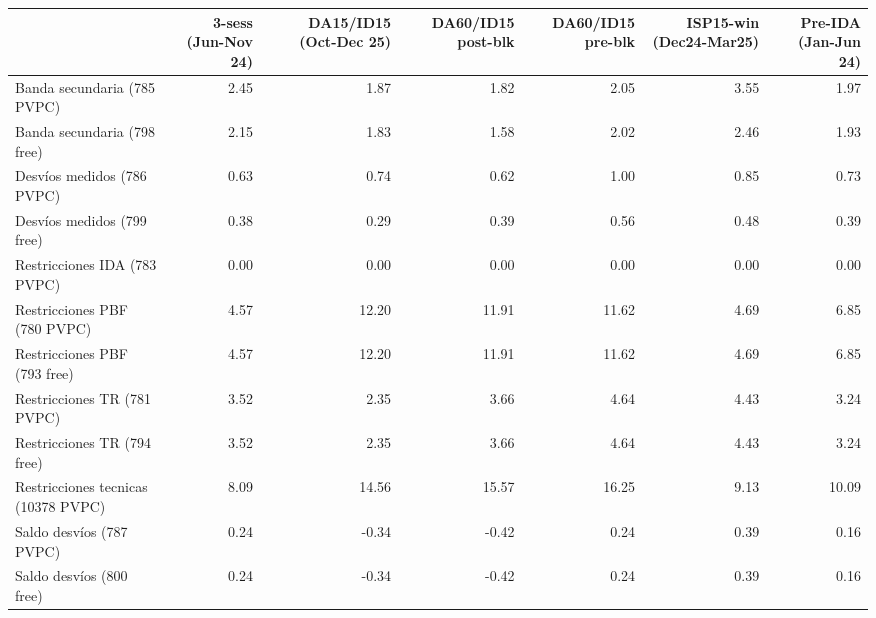 \begin{tabular}{lrrrrrr}
\toprule
 & 3-sess (Jun-Nov 24) & DA15/ID15 (Oct-Dec 25) & DA60/ID15 post-blk & DA60/ID15 pre-blk & ISP15-win (Dec24-Mar25) & Pre-IDA (Jan-Jun 24) \\
\midrule
Banda secundaria (785 PVPC) & 2.45 & 1.87 & 1.82 & 2.05 & 3.55 & 1.97 \\
Banda secundaria (798 free) & 2.15 & 1.83 & 1.58 & 2.02 & 2.46 & 1.93 \\
Desvíos medidos (786 PVPC) & 0.63 & 0.74 & 0.62 & 1.00 & 0.85 & 0.73 \\
Desvíos medidos (799 free) & 0.38 & 0.29 & 0.39 & 0.56 & 0.48 & 0.39 \\
Restricciones IDA (783 PVPC) & 0.00 & 0.00 & 0.00 & 0.00 & 0.00 & 0.00 \\
Restricciones PBF (780 PVPC) & 4.57 & 12.20 & 11.91 & 11.62 & 4.69 & 6.85 \\
Restricciones PBF (793 free) & 4.57 & 12.20 & 11.91 & 11.62 & 4.69 & 6.85 \\
Restricciones TR (781 PVPC) & 3.52 & 2.35 & 3.66 & 4.64 & 4.43 & 3.24 \\
Restricciones TR (794 free) & 3.52 & 2.35 & 3.66 & 4.64 & 4.43 & 3.24 \\
Restricciones tecnicas (10378 PVPC) & 8.09 & 14.56 & 15.57 & 16.25 & 9.13 & 10.09 \\
Saldo desvíos (787 PVPC) & 0.24 & -0.34 & -0.42 & 0.24 & 0.39 & 0.16 \\
Saldo desvíos (800 free) & 0.24 & -0.34 & -0.42 & 0.24 & 0.39 & 0.16 \\
\bottomrule
\end{tabular}
